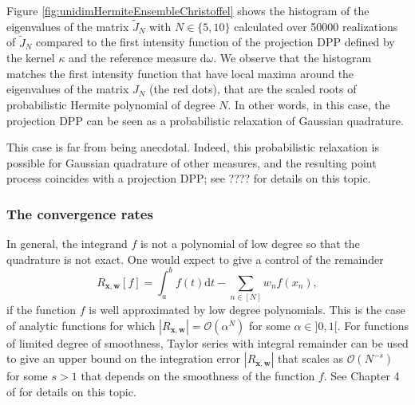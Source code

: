 \documentclass[twoside,11pt]{book}
\numberwithin{theorem}{chapter}
\numberwithin{definition}{chapter}
\numberwithin{proposition}{chapter}
\numberwithin{corollary}{chapter}
\numberwithin{example}{chapter}
\numberwithin{lemma}{chapter}
\numberwithin{assumption}{chapter}
\begin{document}
Figure \ref{fig:unidimHermiteEnsembleChristoffel} shows the histogram of the eigenvalues of the matrix $\tilde{J}_N$ with $N \in \{5,10 \}$ calculated over 50000 realizations of $\tilde{J}_N$ compared to the first intensity function of the projection DPP defined by the kernel $\kappa$ and the reference measure $\mathrm{d}\omega$. We observe that the histogram matches the first intensity function that have local maxima around the eigenvalues of the matrix $J_{N}$ (the red dots), that are the scaled roots of probabilistic Hermite polynomial of degree $N$.
In other words, in this case, the projection DPP can be seen as a probabilistic relaxation of Gaussian quadrature. 

This case is far from being anecdotal. Indeed, this probabilistic relaxation is possible for Gaussian quadrature of other measures, and the resulting point process coincides with a projection DPP; see ???? for details on this topic.



\subsubsection{The convergence rates}


In general, the integrand $f$ is not a polynomial of low degree so that the quadrature is not exact. One would expect to give a control of the remainder 
\begin{equation}
R_{\bm{x},\bm{w}} [f] = \int_{a}^{b}f(t)\mathrm{d}t - \sum\limits_{n \in [N]} w_{n}f(x_{n}),
\end{equation}
if the function $f$ is well approximated by low degree polynomials. This is the case of analytic functions for which $|R_{\bm{x},\bm{w}}| = \mathcal{O}(\alpha^{N})$ for some $\alpha \in ]0,1[$. For functions of limited degree of smoothness, Taylor series with integral remainder can be used to give an upper bound on the integration error $|R_{\bm{x},\bm{w}}|$ that scales as $\mathcal{O}(N^{-s})$ for some $s >1$ that depends on the smoothness of the function $f$. See Chapter 4 of \citep{DavRab84} for details on this topic. 
\end{document}
